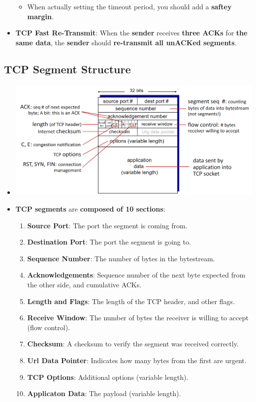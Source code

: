 \documentclass{article}
\begin{document}
\begin{itemize}
\begin{enumerate}
        \end{enumerate}
        \begin{itemize}
            \item When actually setting the timeout period, you should add a \textbf{saftey margin}. 
        \end{itemize}
        \item \textbf{TCP Fast Re-Transmit}: When the \textbf{sender} receives \textbf{three ACKs} for \textbf{the same data}, the \textbf{sender} should \textbf{re-transmit all unACKed segments}.
    \end{itemize}

    \subsection*{TCP Segment Structure}
    \begin{itemize}
        \item[] \includegraphics*[width=\textwidth - 25pt]{images/TCP.PNG}
        \item \textbf{TCP segments} are \textbf{composed of 10 sections}:
        \begin{enumerate}
            \item \textbf{Source Port}: The port the segment is coming from.
            \item \textbf{Destination Port}: The port the segment is going to.
            \item \textbf{Sequence Number}: The number of bytes in the bytestream.
            \item \textbf{Acknowledgements}: Sequence number of the next byte expected from the other side, and cumulative ACKs.
            \item \textbf{Length and Flags}: The length of the TCP header, and other flags.
            \item \textbf{Receive Window}: The number of bytes the receiver is willing to accept (flow control).
            \item \textbf{Checksum}: A checksum to verify the segment was received correctly.
            \item \textbf{Url Data Pointer}: Indicates how many bytes from the first are urgent.
            \item \textbf{TCP Options}: Additional options (variable length).
            \item \textbf{Applicaton Data}: The payload (variable length).
        \end{enumerate}
    \end{itemize}
\end{document}
